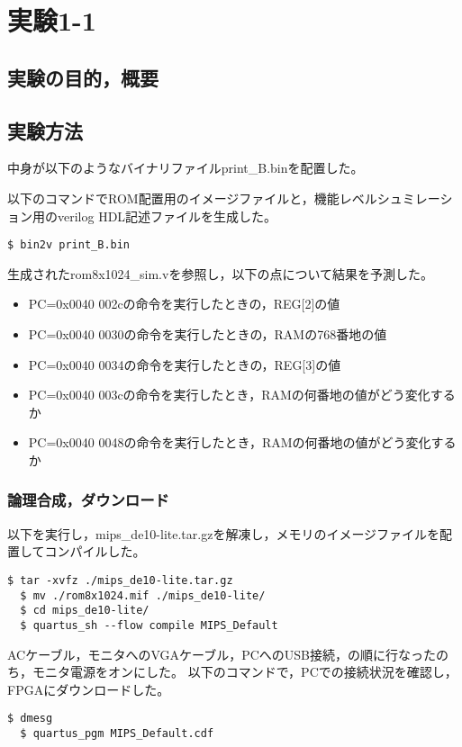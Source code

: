 
\section{実験1-1}
\subsection{実験の目的，概要}

\subsection{実験方法}
中身が以下のようなバイナリファイルprint\_B.binを配置した。


以下のコマンドでROM配置用のイメージファイルと，機能レベルシュミレーション用のverilog HDL記述ファイルを生成した。
\begin{lstlisting}[caption={イメージファイルの作成},label={イメージファイルの作成1-1}]
  $ bin2v print_B.bin
\end{lstlisting}

生成されたrom8x1024\_sim.vを参照し，以下の点について結果を予測した。
\begin{itemize}
  \item PC=0x0040 002cの命令を実行したときの，REG[2]の値
  \item PC=0x0040 0030の命令を実行したときの，RAMの768番地の値
  \item PC=0x0040 0034の命令を実行したときの，REG[3]の値
  \item PC=0x0040 003cの命令を実行したとき，RAMの何番地の値がどう変化するか
  \item PC=0x0040 0048の命令を実行したとき，RAMの何番地の値がどう変化するか
\end{itemize}

\subsubsection{論理合成，ダウンロード}
以下を実行し，mips\_de10-lite.tar.gzを解凍し，メモリのイメージファイルを配置してコンパイルした。
\begin{lstlisting}[caption={論理合成操作},label={論理合成操作1-1}]
  $ tar -xvfz ./mips_de10-lite.tar.gz
  $ mv ./rom8x1024.mif ./mips_de10-lite/
  $ cd mips_de10-lite/
  $ quartus_sh --flow compile MIPS_Default
\end{lstlisting}

ACケーブル，モニタへのVGAケーブル，PCへのUSB接続，の順に行なったのち，モニタ電源をオンにした。
以下のコマンドで，PCでの接続状況を確認し，FPGAにダウンロードした。
\begin{lstlisting}[caption={FPGAでの回路実現},label={FPGAでの回路実現1-1}]
  $ dmesg
  $ quartus_pgm MIPS_Default.cdf
\end{lstlisting}

